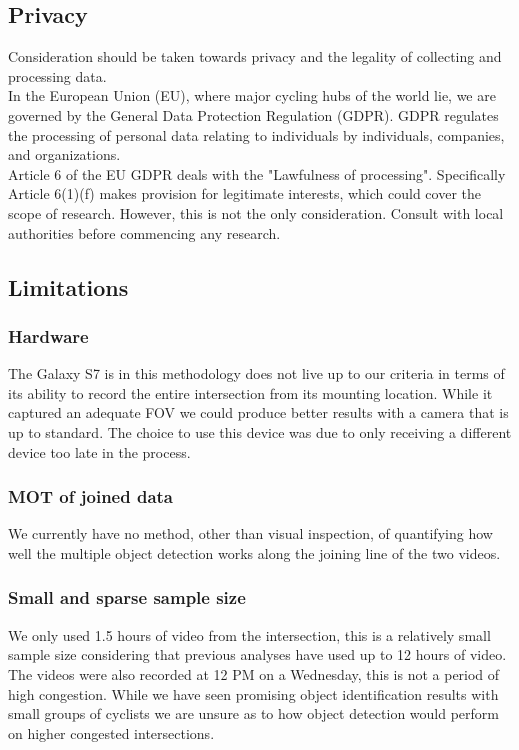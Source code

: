\subsection{Privacy}

Consideration should be taken towards privacy and the legality of collecting and processing data.
\ \\

In the European Union (EU), where major cycling hubs of the world lie, we are governed by the General Data Protection Regulation (GDPR). GDPR regulates the processing of personal data 
relating to individuals by individuals, companies, and organizations.
\ \\

Article 6 of the EU GDPR deals with the "Lawfulness of processing". Specifically Article 6(1)(f)
makes provision for legitimate interests, which could cover the scope of research.
However, this is not the only consideration. Consult with local authorities before commencing any research.
\ \\

\subsection{Limitations}
\subsubsection{Hardware}
The Galaxy S7 is in this methodology does not live up to our criteria in terms of its 
ability to record the entire intersection from its mounting location. While it captured an adequate 
FOV we could produce better results with a camera that is up to standard. The choice to use this device 
was due to only receiving a different device too late in the process.
\ \\

\subsubsection{MOT of joined data}
We currently have no method, other than visual inspection, of quantifying how well the multiple object 
detection works along the joining line of the two videos.
\ \\

\subsubsection{Small and sparse sample size}
We only used 1.5 hours of video from the intersection, this is a relatively small sample size considering
that previous analyses have used up to 12 hours of video. The videos were also recorded at 12 PM on a Wednesday,
this is not a period of high congestion. While we have seen promising object identification results with small groups
of cyclists we are unsure as to how object detection would perform on higher congested intersections. 
\ \\

